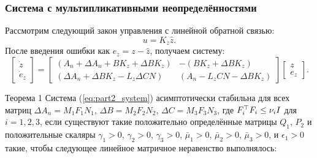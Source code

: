 \begin{frame}
	\frametitle{Система с мультипликативными неопределённостями}
	    Рассмотрим следующий закон управления с линейной обратной связью:
	\begin{equation}
		\label{eq:control_law}
		u={K}_z\hat{z}.
	\end{equation}
	После введения ошибки как $e_z=z-\hat{z}$, получаем систему:
	\begin{equation}
		\label{eq:part2_system}
		\begin{bmatrix}
			\dot{z} \\ \dot{e}_z
		\end{bmatrix}=\begin{bmatrix}
			({A}_n+\Delta {A}_n +{B}{K}_z+\Delta {B}{K}_z) & -({B}{K}_z+\Delta {B}{K}_z) \\
			(\Delta {A}_n +\Delta {B}{K}_z-{L}_z\Delta {C}{N}) & ({A}_n-{L}_z{C}{N}-\Delta {B}{K}_z)        \end{bmatrix}\begin{bmatrix}
			z \\ e_z
		\end{bmatrix}.
	\end{equation}
	\begin{block}{Теорема 1}
		Система (\ref{eq:part2_system}) асимптотически стабильна для всех матриц
		$\Delta {A}_n={M}_1{F}_1{N}_1$, 
		$\Delta {B}= {M}_2{F}_2{N}_2$, 
		$\Delta {C} = {M}_3{F}_3{N}_3$,
		где
		${F}_i^\top{F}_i\leq \nu_i {I}$ для $i=1,2,3$,
		если существуют такие положительно определённые матрицы ${Q}_1$, ${P}_2$ и положительные скаляры
		$\gamma_1>0$, $\gamma_2>0$, $\gamma_3>0$, $\bar{\mu}_1>0$, $\bar{\mu}_2>0$, $\bar{\mu}_3>0$, и $\epsilon_1 > 0$ такие, чтобы следующее линейное матричное неравенство выполнялось:
	\end{block}
\end{frame}

